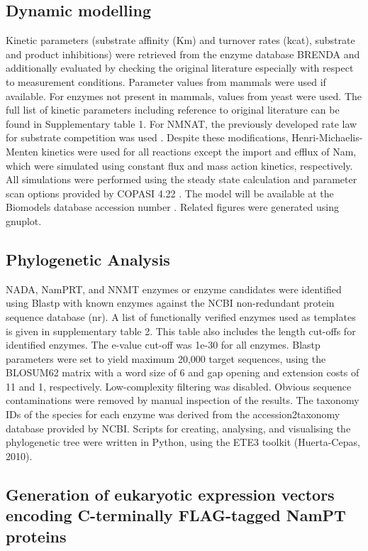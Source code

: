 \documentclass[paper=a4, 12pt]{scrartcl}
\begin{document}
\subsection{Dynamic modelling}

Kinetic parameters (substrate affinity (Km) and turnover rates (kcat), substrate and product inhibitions) were retrieved from the enzyme database BRENDA and additionally evaluated by checking the original literature especially with respect to measurement conditions. Parameter values from mammals were used if available. For enzymes not present in mammals, values from yeast were used. The full list of kinetic parameters including reference to original literature can be found in Supplementary table 1. For NMNAT, the previously developed rate law for substrate competition was used \cite{Schauble2013}. Despite these modifications, Henri-Michaelis-Menten kinetics were used for all reactions except the import and efflux of Nam, which were simulated using constant flux and mass action kinetics, respectively. All simulations were performed using the steady state calculation and parameter scan options provided by COPASI 4.22 \cite{Hoops2006}. The model will be available at the Biomodels database accession number . Related figures were generated using gnuplot.


\subsection{Phylogenetic Analysis}

NADA, NamPRT, and NNMT enzymes or enzyme candidates were identified using Blastp with known enzymes against the NCBI non-redundant protein sequence database (nr). A list of functionally verified enzymes used as templates is given in supplementary table 2. This table also includes the length cut-offs for identified enzymes. The e-value cut-off was 1e-30 for all enzymes. Blastp parameters were set to yield maximum 20,000 target sequences, using the BLOSUM62 matrix with a word size of 6 and gap opening and extension costs of 11 and 1, respectively. Low-complexity filtering was disabled. Obvious sequence contaminations were removed by manual inspection of the results. The taxonomy IDs of the species for each enzyme was derived from the accession2taxonomy database provided by NCBI. Scripts for creating, analysing, and visualising the phylogenetic tree were written in Python, using the ETE3 toolkit (Huerta-Cepas, 2010).


\subsection{Generation of eukaryotic expression vectors encoding C-terminally FLAG-tagged NamPT proteins}
\end{document}
